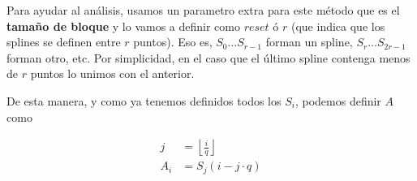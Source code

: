 Para ayudar al an\'alisis, usamos un parametro extra para este m\'etodo que es el 
\textbf{tama\~no de bloque} y lo vamos a definir como
$reset$ \'o $r$ (que indica que los splines se definen entre $r$ puntos). Eso es,
$S_0 \ldots S_{r - 1}$ forman un spline, $S_r \ldots S_{2r - 1}$ forman otro,
etc. Por simplicidad, en el caso que el \'ultimo spline contenga menos de $r$
puntos lo unimos con el anterior.

De esta manera, y como ya tenemos definidos todos los $S_i$, podemos definir $A$ como

\[
\begin{split}
j & = \left\lfloor \frac{i}{q} \right\rfloor \\
A_i & = S_j(i - j \cdot q)
\end{split}
\]
